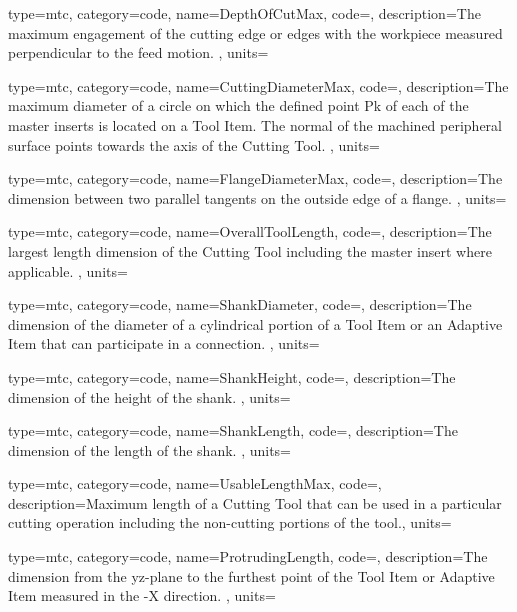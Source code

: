 {
  type=mtc,
  category=code,
  name={DepthOfCutMax},
  code=,
  description={The maximum engagement of the cutting edge or edges with the workpiece measured perpendicular to the feed motion. },
  units=
}

{
  type=mtc,
  category=code,
  name={CuttingDiameterMax},
  code=,
  description={The maximum diameter of a circle on which the defined point Pk of each of the master inserts is located on a Tool Item. The normal of the machined peripheral surface points towards the axis of the Cutting Tool. },
  units=
}

{
  type=mtc,
  category=code,
  name={FlangeDiameterMax},
  code=,
  description={The dimension between two parallel tangents on the outside edge of a flange. },
  units=
}

{
  type=mtc,
  category=code,
  name={OverallToolLength},
  code=,
  description={The largest length dimension of the Cutting Tool including the master insert where applicable.  },
  units=
}

{
  type=mtc,
  category=code,
  name={ShankDiameter},
  code=,
  description={The dimension of the diameter of a cylindrical portion of a Tool Item or an Adaptive Item that can participate in a connection. },
  units=
}

{
  type=mtc,
  category=code,
  name={ShankHeight},
  code=,
  description={The dimension of the height of the shank. },
  units=
}

{
  type=mtc,
  category=code,
  name={ShankLength},
  code=,
  description={The dimension of the length of the shank. },
  units=
}

{
  type=mtc,
  category=code,
  name={UsableLengthMax},
  code=,
  description={Maximum length of a Cutting Tool that can be used in a particular cutting operation including the non-cutting portions of the tool.},
  units=
}

{
  type=mtc,
  category=code,
  name={ProtrudingLength},
  code=,
  description={The dimension from the yz-plane to the furthest point of the Tool Item or Adaptive Item measured in the -X direction. },
  units=
}

